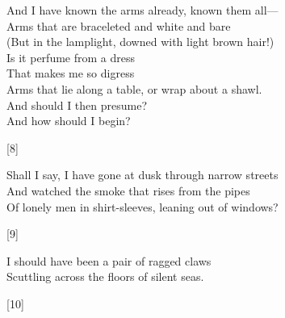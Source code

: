 \documentclass{article}
\newcommand\tab[1][1cm]{\hspace*{#1}}
\begin{document}
\begin{multicols}{2}
\begin{minipage}{9cm}
\end{minipage}

\end{multicols}

\begin{multicols}{2}


\begin{minipage}{9cm}
    And I have known the arms already, known them all---\\
    Arms that are braceleted and white and bare\\
    (But in the lamplight, downed with light brown hair!)\\
    Is it perfume from a dress\\
    That makes me so digress\\
    Arms that lie along a table, or wrap about a shawl.\\
    \tab{}And should I then presume?\\
    \tab{}And how should I begin?
    \begin{center}[8]\end{center}
    \dotfill
\end{minipage}

\begin{minipage}{8.5cm}
Shall I say, I have gone at dusk through narrow streets\\
And watched the smoke that rises from the pipes\\
Of lonely men in shirt-sleeves, leaning out of windows?
\begin{center}[9]\end{center}
I should have been a pair of ragged claws\\
Scuttling across the floors of silent seas.\\
\begin{center}[10]\end{center}
\dotfill
\end{minipage}

\end{multicols}
\end{document}
